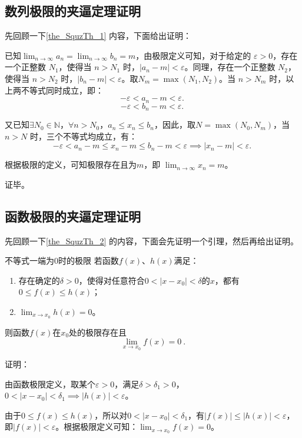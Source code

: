 \subsection{数列极限的夹逼定理证明}

先回顾一下\autoref{the_SquzTh_1} 内容，下面给出证明：

已知$\lim_{n \to \infty} a_n = \lim_{n \to \infty} b_n = m$，由极限定义可知，对于给定的 $\varepsilon > 0$，存在一个正整数 $N_1$，使得当 $n > N_1$ 时，$|a_n - m| < \varepsilon$。同理，存在一个正整数 $N_2$，使得当 $n > N_2$ 时，$|b_n - m| < \varepsilon$。取$N_m = \max(N_1, N_2)$。当 $n > N_m$ 时，以上两不等式同时成立，即：
\begin{equation}
- \varepsilon < a_n-m <\varepsilon.~
\end{equation}
\begin{equation}
-\varepsilon < b_n-m <\varepsilon.~
\end{equation}

又已知$\exists N_0\in \mathbb{N}$，$\forall n>N_0$，$a_n\leq x_n\leq b_n$，因此，取$N=\max(N_0, N_m)$，当 $n > N$ 时，三个不等式均成立，有：
\begin{equation}
- \varepsilon < a_n-m \leq x_n-m \leq b_n-m <\varepsilon\implies |x_n-m|<\varepsilon.~
\end{equation}

根据极限的定义，可知极限存在且为$m$，即 $\lim_{n \to \infty} x_n = m$。

证毕。


\subsection{函数极限的夹逼定理证明}


先回顾一下\autoref{the_SquzTh_2} 的内容，下面会先证明一个引理，然后再给出证明。

\begin{lemma}{不等式一端为0时的极限}\label{lem_SquzTh_1}
若函数$f(x)$、$h(x)$满足：
\begin{enumerate}
\item 存在确定的$\delta>0$，使得对任意符合$0<|x-x_0|<\delta$的$x$，都有$0\leq f(x)\leq h(x)$；
\item $\lim _{x\to x_0}h(x)=0$。
\end{enumerate}
则函数$f(x)$在$x_0$处的极限存在且
\begin{equation}
\lim _{x\to x_0}f(x)=0~.
\end{equation}

证明：

由函数极限定义，取某个$\varepsilon>0$，满足$\delta>\delta_1>0$，$0<|x-x_0|<\delta_1\implies|h(x)|<\varepsilon$。

由于$0\leq f(x)\leq h(x)$，所以对$0<|x-x_0|<\delta_1$，有$|f(x)|\leq |h(x)|<\varepsilon$，即$|f(x)|<\varepsilon$。根据极限定义可知：$\lim _{x\to x_0}f(x)=0$。

\end{lemma}


